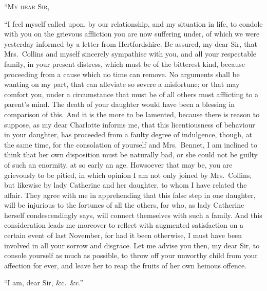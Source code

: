 \begin{letter}
“\textsc{My dear Sir},

“I feel myself called upon, by our relationship, and
my situation in life, to condole with you on the grievous
affliction you are now suffering under, of which we were
yesterday informed by a letter from Hertfordshire. Be
assured, my dear Sir, that Mrs.\ Collins and myself sincerely
sympathise with you, and all your respectable family, in
your present distress, which must be of the bitterest kind,
because proceeding from a cause which no time can remove.
No arguments shall be wanting on my part, that can
alleviate so severe a misfortune; or that may comfort
you, under a circumstance that must be of all others most
afflicting to a parent’s mind. The death of your daughter
would have been a blessing in comparison of this. And
it is the more to be lamented, because there is reason to
suppose, as my dear Charlotte informs me, that this
licentiousness of behaviour in your daughter, has proceeded
from a faulty degree of indulgence, though, at the
same time, for the consolation of yourself and Mrs.\ Bennet,
I am inclined to think that her own disposition must be
naturally bad, or she could not be guilty of such an
enormity, at so early an age. Howsoever that may be,
you are grievously to be pitied, in which opinion I am not
only joined by Mrs.\ Collins, but likewise by lady Catherine
and her daughter, to whom I have related the affair.
They agree with me in apprehending that this false step
in one daughter, will be injurious to the fortunes of all
the others, for who, as lady Catherine herself condescendingly
says, will connect themselves with such a family.
And this consideration leads me moreover to reflect with
augmented satisfaction on a certain event of last November,
for had it been otherwise, I must have been involved
in all your sorrow and disgrace. Let me advise you then,
my dear Sir, to console yourself as much as possible, to
throw off your unworthy child from your affection for
ever, and leave her to reap the fruits of her own heinous
offence.

\raggedleft “I am, dear Sir, \&c.\ \&c.”
\end{letter}

